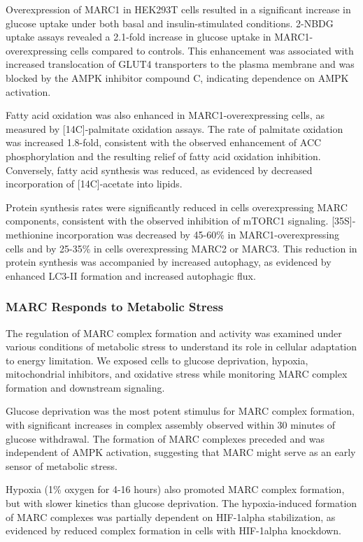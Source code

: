 \documentclass[11pt,a4paper]{article}
\begin{document}
Overexpression of MARC1 in HEK293T cells resulted in a significant increase in glucose uptake under both basal and insulin-stimulated conditions. 2-NBDG uptake assays revealed a 2.1-fold increase in glucose uptake in MARC1-overexpressing cells compared to controls. This enhancement was associated with increased translocation of GLUT4 transporters to the plasma membrane and was blocked by the AMPK inhibitor compound C, indicating dependence on AMPK activation.

Fatty acid oxidation was also enhanced in MARC1-overexpressing cells, as measured by [14C]-palmitate oxidation assays. The rate of palmitate oxidation was increased 1.8-fold, consistent with the observed enhancement of ACC phosphorylation and the resulting relief of fatty acid oxidation inhibition. Conversely, fatty acid synthesis was reduced, as evidenced by decreased incorporation of [14C]-acetate into lipids.

Protein synthesis rates were significantly reduced in cells overexpressing MARC components, consistent with the observed inhibition of mTORC1 signaling. [35S]-methionine incorporation was decreased by 45-60\% in MARC1-overexpressing cells and by 25-35\% in cells overexpressing MARC2 or MARC3. This reduction in protein synthesis was accompanied by increased autophagy, as evidenced by enhanced LC3-II formation and increased autophagic flux.

\subsubsection{MARC Responds to Metabolic Stress}

The regulation of MARC complex formation and activity was examined under various conditions of metabolic stress to understand its role in cellular adaptation to energy limitation. We exposed cells to glucose deprivation, hypoxia, mitochondrial inhibitors, and oxidative stress while monitoring MARC complex formation and downstream signaling.

Glucose deprivation was the most potent stimulus for MARC complex formation, with significant increases in complex assembly observed within 30 minutes of glucose withdrawal. The formation of MARC complexes preceded and was independent of AMPK activation, suggesting that MARC might serve as an early sensor of metabolic stress.

Hypoxia (1\% oxygen for 4-16 hours) also promoted MARC complex formation, but with slower kinetics than glucose deprivation. The hypoxia-induced formation of MARC complexes was partially dependent on HIF-1alpha stabilization, as evidenced by reduced complex formation in cells with HIF-1alpha knockdown.
\end{document}
